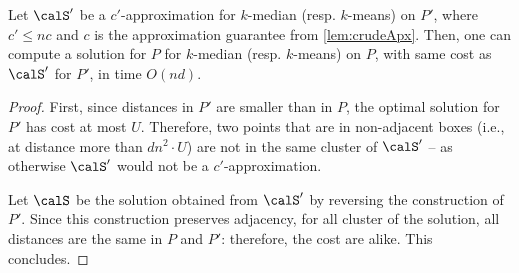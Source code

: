 \begin{lemma}
Let $\calS'$ be a $c'$-approximation for  $k$-median (resp. $k$-means) on $P'$, where $c' \leq nc$ and $c$ is the approximation guarantee from \cref{lem:crudeApx}. Then, one can compute a solution for $P$ for $k$-median (resp. $k$-means) on $P$, with same cost as $\calS'$ for $P'$, in time $O(nd)$.
\end{lemma}
\begin{proof}
First, since distances in $P'$ are smaller than in $P$, the optimal solution for $P'$ has cost at most $U$. Therefore, two points that are in non-adjacent boxes (i.e., at distance more than $d n^2\cdot U$) are not in the same cluster of $\calS'$ -- as otherwise $\calS'$ would not be a $c'$-approximation.

Let $\calS$ be the solution obtained from $\calS'$ by reversing the construction of $P'$. Since this construction preserves adjacency, for all cluster of the solution, all distances are the same in $P$ and $P'$: therefore, the cost are alike. This concludes.
\end{proof}

